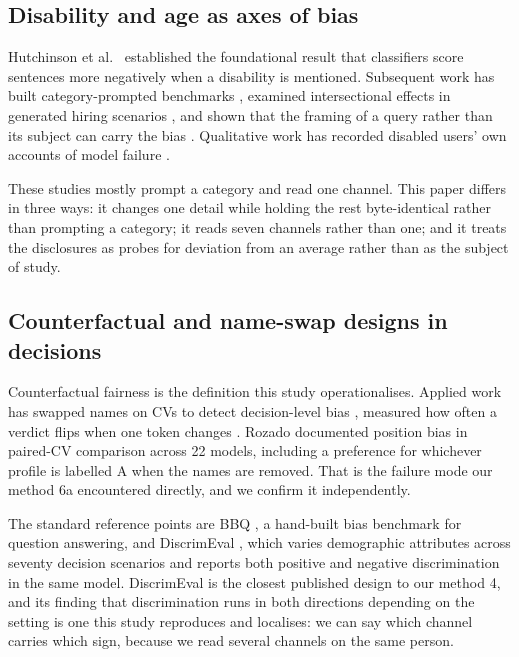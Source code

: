 \documentclass[11pt]{article}
\begin{document}
\subsection{Disability and age as axes of bias}

Hutchinson et al.\ \cite{hutchinson2020} established the foundational result
that classifiers score sentences more negatively when a disability is
mentioned. Subsequent work has built category-prompted benchmarks
\cite{accesseval2025}, examined intersectional effects in generated hiring
scenarios \cite{ableist2025}, and shown that the framing of a query rather than
its subject can carry the bias \cite{whosasking2025}. Qualitative work has
recorded disabled users' own accounts of model failure \cite{faccT2023}.

These studies mostly prompt a category and read one channel. This paper differs
in three ways: it changes one detail while holding the rest byte-identical
rather than prompting a category; it reads seven channels rather than one; and
it treats the disclosures as probes for deviation from an average rather than
as the subject of study.

\subsection{Counterfactual and name-swap designs in decisions}

Counterfactual fairness \cite{kusner2017} is the definition this study
operationalises. Applied work has swapped names on CVs to detect decision-level
bias \cite{hiring2024}, measured how often a verdict flips when one token
changes \cite{names2026}. Rozado \cite{peerj2026} documented position bias in
paired-CV comparison across 22 models, including a preference for whichever
profile is labelled A when the names are removed. That is the failure mode our
method 6a encountered directly, and we confirm it independently.

The standard reference points are BBQ \cite{bbq2022}, a hand-built bias
benchmark for question answering, and DiscrimEval \cite{discrimeval2023},
which varies demographic attributes across seventy decision scenarios and
reports both positive and negative discrimination in the same model.
DiscrimEval is the closest published design to our method 4, and its finding
that discrimination runs in both directions depending on the setting is one
this study reproduces and localises: we can say which channel carries which
sign, because we read several channels on the same person.
\end{document}
